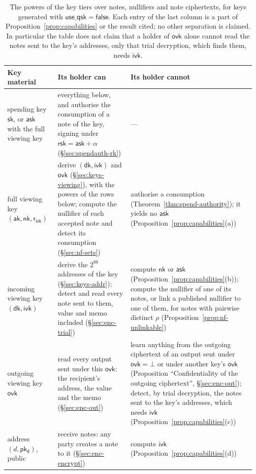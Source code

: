 \documentclass[11pt,a4paper]{article}
\theoremstyle{definition}
\newcommand{\ask}{\ensuremath{\mathsf{ask}}}
\newcommand{\aksym}{\ensuremath{\mathsf{ak}}}
\newcommand{\nksym}{\ensuremath{\mathsf{nk}}}
\newcommand{\ivk}{\ensuremath{\mathsf{ivk}}}
\newcommand{\ovk}{\ensuremath{\mathsf{ovk}}}
\newcommand{\dk}{\ensuremath{\mathsf{dk}}}
\newcommand{\pkd}{\ensuremath{\mathsf{pk_d}}}
\newcommand{\rivk}{\ensuremath{\mathsf{r_{ivk}}}}
\newcommand{\rsk}{\ensuremath{\mathsf{rsk}}}
\begin{document}
\begin{table}[tp]
\centering\small
\setlength{\tabcolsep}{4pt}
\begin{tabular}{@{}p{2.7cm}p{5.6cm}p{4.9cm}@{}}
\toprule
Key material & Its holder can & Its holder cannot \tabularnewline
\midrule
spending key $\mathsf{sk}$, or $\ask$ with the full viewing key
  & everything below, and authorise the consumption of a note of the key,
    signing under $\rsk = \ask + \alpha$ (\S\ref{sec:spendauth-rk})
  & --- \tabularnewline
\addlinespace
full viewing key $(\aksym, \nksym, \rivk)$
  & derive $(\dk, \ivk)$ and $\ovk$ (\S\ref{sec:keys-viewing}), with the
    powers of the rows below; compute the nullifier of each accepted note
    and detect its consumption (\S\ref{sec:nf-sets})
  & authorise a consumption (Theorem~\ref{thm:spend-authority}); it
    yields no $\ask$ (Proposition~\ref{prop:capabilities}(a))
    \tabularnewline
\addlinespace
incoming viewing key $(\dk, \ivk)$
  & derive the $2^{88}$ addresses of the key (\S\ref{sec:keys-addr});
    detect and read every note sent to them, value and memo included
    (\S\ref{sec:enc-trial})
  & compute $\nksym$ or $\ask$ (Proposition~\ref{prop:capabilities}(b));
    compute the nullifier of one of its notes, or link a published
    nullifier to one of them, for notes with pairwise distinct $\rho$
    (Proposition~\ref{prop:nf-unlinkable}) \tabularnewline
\addlinespace
outgoing viewing key $\ovk$
  & read every output sent under this $\ovk$: the recipient's address, the
    value and the memo (\S\ref{sec:enc-out})
  & learn anything from the outgoing ciphertext of an output sent under
    $\ovk = \bot$ or under another key's $\ovk$ (Proposition
    ``Confidentiality of the outgoing ciphertext'', \S\ref{sec:enc-out});
    detect, by trial decryption, the notes sent to the
    key's addresses, which needs $\ivk$
    (Proposition~\ref{prop:capabilities}(c)) \tabularnewline
\addlinespace
address $(d, \pkd)$, public
  & receive notes: any party creates a note to it (\S\ref{sec:enc-encrypt})
  & compute $\ivk$ (Proposition~\ref{prop:capabilities}(d)) \tabularnewline
\bottomrule
\end{tabular}
\caption{The powers of the key tiers over notes, nullifiers and note
ciphertexts, for keys generated with $\mathsf{use\_qsk} = \mathsf{false}$.
Each entry of the last column is a part of
Proposition~\ref{prop:capabilities} or the result cited; no other separation
is claimed. In particular the table does not claim that a holder of $\ovk$
alone cannot read the notes sent to the key's addresses, only that trial
decryption, which finds them, needs $\ivk$.}
\label{tab:key-tiers}
\end{table}
\end{document}
